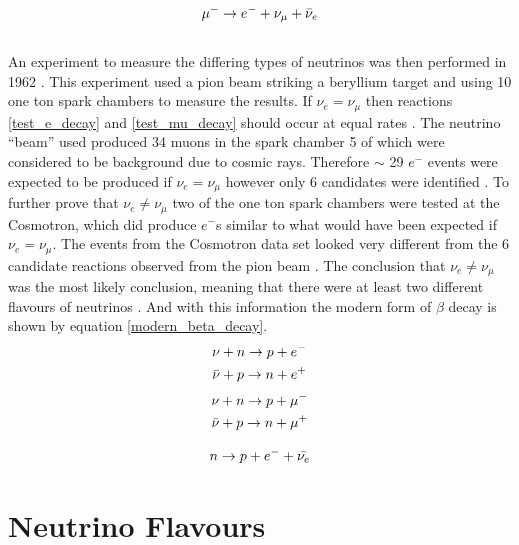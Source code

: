 \begin{equation}
    \mu^- \rightarrow e^- + \nu_\mu + \Bar{\nu}_e
    \label{proper_mu_decay}
\end{equation}
\\An experiment to measure the differing types of neutrinos was then performed in 1962 \cite{DanbyG1962PhysRevLett.9.36}. This experiment used a pion beam striking a beryllium target and using 10 one ton spark chambers to measure the results. If $\nu_e = \nu_\mu$ then reactions \ref{test_e_decay} and \ref{test_mu_decay} should occur at equal rates \cite{DanbyG1962PhysRevLett.9.36}. The neutrino ``beam'' used produced 34 muons in the spark chamber 5 of which were considered to be background due to cosmic rays. Therefore $\sim$ 29 $e^-$ events were expected to be produced if $\nu_e = \nu_\mu$ however only 6 candidates were identified \cite{DanbyG1962PhysRevLett.9.36}. To further prove that $\nu_e \not= \nu_\mu$ two of the one ton spark chambers were tested at the Cosmotron, which did produce $e^-$s similar to what would have been expected if $\nu_e = \nu_\mu$. The events from the Cosmotron data set looked very different from the 6 candidate reactions observed from the pion beam \cite{DanbyG1962PhysRevLett.9.36}. The conclusion that $\nu_e \not= \nu_\mu$ was the most likely conclusion, meaning that there were at least two different flavours of neutrinos \cite{DanbyG1962PhysRevLett.9.36}. And with this information the modern form of $\beta$ decay is shown by equation \ref{modern_beta_decay}.
\begin{equation}
    \begin{split}
    \nu + n \rightarrow p + e^- \\
    \Bar{\nu} + p \rightarrow n + e^+
    \label{test_e_decay}
    \end{split}
\end{equation}
\begin{equation}
    \begin{split}
    \nu + n \rightarrow p + \mu^-  \\
    \Bar{\nu} + p \rightarrow n + \mu^+
    \label{test_mu_decay}
    \end{split}
\end{equation}

\begin{equation}
    n \rightarrow p + e^- + \Bar{\nu_e} 
    \label{modern_beta_decay}
\end{equation}

\section{Neutrino Flavours}
